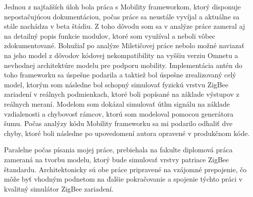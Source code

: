 \documentclass[11pt,twoside,a4paper]{book}
\begin{document}
Jednou z najťažších úloh bola práca s Mobility frameworkom, ktorý disponuje nepostačujúcou dokumentáciou, počas práce sa neustále vyvíjal a aktuálne sa stále nachádza v beta štádiu. Z toho dôvodu som sa v analýze práce zameral aj na detailný popis funkcie modulov, ktoré som využíval a neboli vôbec zdokumentované. Bohužiaľ po analýze Miletičovej práce nebolo možné naviazať na jeho model z dôvodov kódovej nekompatibility na vyššiu verziu Omnetu a nevhodnej architektúre modelu pre podporu mobility. Implementácia antén do toho frameworku sa úspešne podarila a taktiež bol úspešne zrealizovaný celý model, ktorým som následne bol schopný simulovať fyzickú vrstvu ZigBee zariadení v reálnych podmienkach, ktoré boli popísané na základe výstupov z reálnych meraní. Modelom som dokázal simulovať útlm signálu na základe vzdialenosti a chybovosť rámcov, ktorú som modeloval pomocou generátora šumu. Počas analýzy kódu Mobility frameworku sa mi podarilo odhaliť dve chyby, ktoré boli následne po upovedomení autora opravené v produkčnom kóde.

Paralelne počas písania mojej práce, prebiehala na fakulte diplomová práca zameraná na tvorbu modelu, ktorý bude simulovať vrstvy patriace ZigBee štandardu. Architektonicky sú obe práce pripravené na vzájomné prepojenie, čo môže byť vhodným podnetom na ďalšie pokračovanie a spojenie týchto práci v kvalitný simulátor ZigBee zariadení.





%
{
\def\CS{$\cal C\kern-0.1667em\lower.5ex\hbox{$\cal S$}\kern-0.075em $}

}

%
\end{document}
